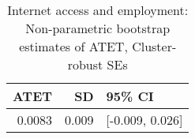 \begin{table}[!h]
\centering
\caption{\label{tab:tab:np_atet_clustered}Internet access and employment: Non-parametric bootstrap estimates of ATET, Cluster-robust SEs}
\centering
\begin{tabular}[t]{rrl}
\toprule
ATET & SD & 95\% CI\\
\midrule
0.0083 & 0.009 & {}[-0.009, 0.026]\\
\bottomrule
\end{tabular}
\end{table}
